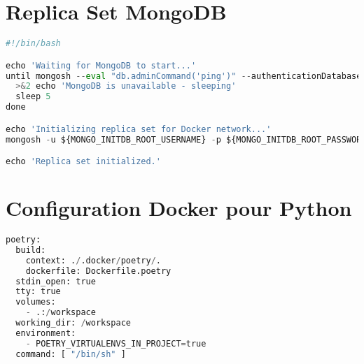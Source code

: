 \section{Replica Set MongoDB}
\label{ann:replica_set}
\begin{lstlisting}[language=Python, caption=Replica Set MongoDB, label=lst:replica_set]
#!/bin/bash

echo 'Waiting for MongoDB to start...'
until mongosh --eval "db.adminCommand('ping')" --authenticationDatabase admin --username ${MONGO_INITDB_ROOT_USERNAME} --password ${MONGO_INITDB_ROOT_PASSWORD}; do
  >&2 echo 'MongoDB is unavailable - sleeping'
  sleep 5
done

echo 'Initializing replica set for Docker network...'
mongosh -u ${MONGO_INITDB_ROOT_USERNAME} -p ${MONGO_INITDB_ROOT_PASSWORD} --authenticationDatabase admin --eval "rs.initiate({_id: 'rs0', members: [{ _id: 0, host: 'mongo1:27017' }, { _id: 1, host: 'mongo2:27017' }, { _id: 2, host: 'mongo3:27017' }]})"

echo 'Replica set initialized.'
\end{lstlisting}

\section{Configuration Docker pour Python}
\label{ann:docker_poetry}
\begin{lstlisting}[language=Python, caption=Fichier de configuration Docker pour Python, label=lst:docker_poetry]
poetry:
  build:
    context: ./.docker/poetry/.
    dockerfile: Dockerfile.poetry
  stdin_open: true
  tty: true
  volumes:
    - .:/workspace
  working_dir: /workspace
  environment:
    - POETRY_VIRTUALENVS_IN_PROJECT=true
  command: [ "/bin/sh" ]
\end{lstlisting}

